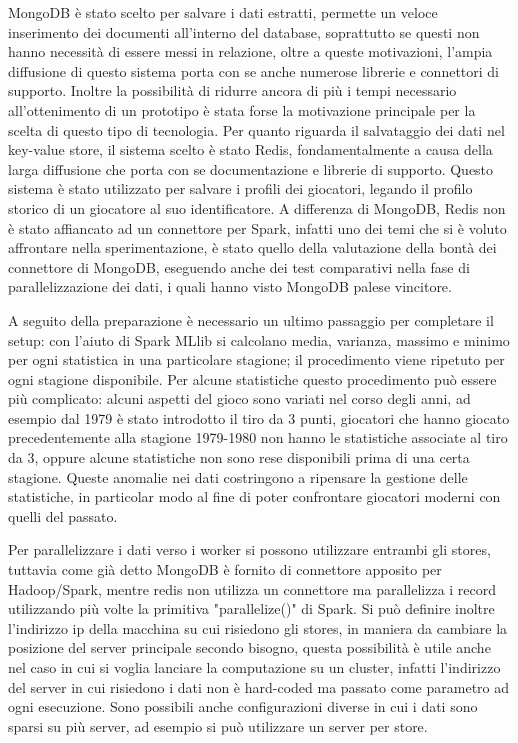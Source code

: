 \documentclass[10pt,a4paper,twocolumn]{article}
\begin{document}
MongoDB è stato scelto per salvare i dati estratti, permette un veloce inserimento dei documenti all'interno del database, soprattutto se questi non hanno necessità di essere messi in relazione, oltre a queste motivazioni, l'ampia diffusione di questo sistema porta con se anche numerose librerie e connettori di supporto.
Inoltre la possibilità di ridurre ancora di più i tempi necessario all'ottenimento di un prototipo è stata forse la motivazione principale per la scelta di questo tipo di tecnologia.
Per quanto riguarda il salvataggio dei dati nel key-value store, il sistema scelto è stato Redis, fondamentalmente a causa della larga diffusione che porta con se documentazione e librerie di supporto. Questo sistema è stato utilizzato per salvare i profili dei giocatori, legando il profilo storico di un giocatore al suo identificatore. A differenza di MongoDB, Redis non è stato affiancato ad un connettore per Spark, infatti uno dei temi che si è voluto affrontare nella sperimentazione, è stato quello della valutazione della bontà dei connettore di MongoDB, eseguendo anche dei test comparativi nella fase di parallelizzazione dei dati, i quali hanno visto MongoDB palese vincitore.

A seguito della preparazione è necessario un ultimo passaggio per completare il setup: con l'aiuto di Spark MLlib si calcolano media, varianza, massimo e minimo per ogni statistica in una particolare stagione; il procedimento viene ripetuto per ogni stagione disponibile. Per alcune statistiche questo procedimento può essere più complicato: alcuni aspetti del gioco sono variati nel corso degli anni, ad esempio dal 1979 è stato introdotto il tiro da 3 punti, giocatori che hanno giocato precedentemente alla stagione 1979-1980 non hanno le statistiche associate al tiro da 3, oppure alcune statistiche non sono rese disponibili prima di una certa stagione. Queste anomalie nei dati costringono a ripensare la gestione delle statistiche, in particolar modo al fine di poter confrontare giocatori moderni con quelli del passato.

Per parallelizzare i dati verso i worker si possono utilizzare entrambi gli stores, tuttavia come già detto MongoDB è fornito di connettore apposito per Hadoop/Spark, mentre redis non utilizza un connettore ma parallelizza i record utilizzando più volte la primitiva "parallelize()" di Spark. Si può definire inoltre l'indirizzo ip della macchina su cui risiedono gli stores, in maniera da cambiare la posizione del server principale secondo bisogno, questa possibilità è utile anche nel caso in cui si voglia lanciare la computazione su un cluster, infatti l'indirizzo del server in cui risiedono i dati non è hard-coded ma passato come parametro ad ogni esecuzione. Sono possibili anche configurazioni diverse in cui i dati sono sparsi su più server, ad esempio si può utilizzare un server per store.
\end{document}

